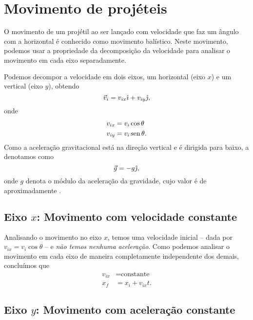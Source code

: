 \section{Movimento de projéteis}

O movimento de um projétil ao ser lançado com velocidade que faz um ângulo com a horizontal é conhecido como movimento balístico. Neste movimento, podemos usar a propriedade da decomposição da velocidade para analisar o movimento em cada eixo separadamente.

Podemos decompor a velocidade em dois eixos, um horizontal (eixo $x$) e um vertical (eixo $y$), obtendo
\begin{equation}
  \vec{v}_i = v_{ix} \hat{\imath} + v_{iy} \hat{\jmath},
\end{equation}
%
onde
\begin{align}
  v_{ix} &= v_i\cos\theta \\
  v_{iy} &= v_i\operatorname{sen}\theta.
\end{align}
%
Como a aceleração gravitacional está na direção vertical e é dirigida para baixo, a denotamos como
\begin{equation}
  \vec{g} = -g\hat{\jmath},
\end{equation}
%
onde $g$ denota o módulo da aceleração da gravidade, cujo valor é de aproximadamente .

\subsection{Eixo $x$: Movimento com velocidade constante}

Analisando o movimento no eixo $x$, temos uma velocidade inicial -- dada por $v_{ix} = v_i\cos\theta$ -- e \emph{não temos nenhuma aceleração}. Como podemos analisar o movimento em cada eixo de maneira completamente independente dos demais, concluímos que
\begin{align}
  v_{ix} &= \text{constante} \\
  x_{f} &= x_{i} + v_{ix}t.\label{Eq:PosXProj}
\end{align}

\subsection{Eixo $y$: Movimento com aceleração constante}

